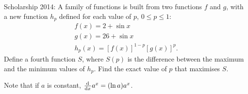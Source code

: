 \begin{questions}
  \questioS Scholarship 2014: A family of functions is built from two functions $ f $ and $ g $, with a new function $ h_p $ defined
            for each value of $ p $, $ 0 \leq p \leq 1 $:
            \begin{gather*}
              f(x) = 2 + \sin x\\
              g(x) = 26 + \sin x\\
              h_p(x) = [f(x)]^{1 - p} [g(x)]^p.
            \end{gather*}
            Define a fourth function $ S $, where $ S(p) $ is the difference between the maximum and the minimum values of $ h_p $. Find
            the exact value of $ p $ that maximises $ S $.

            Note that if $ a $ is constant, $ \od{}{x} a^x = (\ln a) a^x $.
\end{questions}

